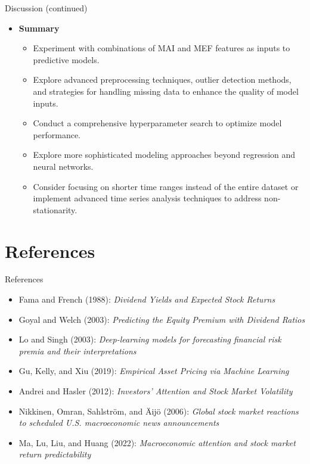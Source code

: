 \documentclass{beamer}
\begin{document}
\begin{frame}{Discussion (continued)}
  \begin{itemize}
    \item \textbf{Summary} 
    \begin{itemize}
        \item Experiment with combinations of MAI and MEF features as inputs to predictive models.
        \item Explore advanced preprocessing techniques, outlier detection methods, and strategies for handling missing data to enhance the quality of model inputs.
        \item Conduct a comprehensive hyperparameter search to optimize model performance.
        \item Explore more sophisticated modeling approaches beyond regression and neural networks.
        \item Consider focusing on shorter time ranges instead of the entire dataset or implement advanced time series analysis techniques to address non-stationarity.
    \end{itemize}
  \end{itemize}
\end{frame}

\section{References}
\begin{frame}{References}
  \begin{itemize}
    \item Fama and French (1988): \emph{Dividend Yields and Expected Stock Returns}
    \item Goyal and Welch (2003): \emph{Predicting the Equity Premium with Dividend Ratios}
    \item Lo and Singh (2003): \emph{Deep-learning models for forecasting financial risk premia and their interpretations}
    \item Gu, Kelly, and Xiu (2019): \emph{Empirical Asset Pricing via Machine Learning}
    \item Andrei and Hasler (2012): \emph{Investors’ Attention and Stock Market Volatility}
    \item Nikkinen, Omran, Sahlström, and Äijö (2006): \emph{Global stock market reactions to scheduled U.S. macroeconomic news announcements}
    \item Ma, Lu, Liu, and Huang (2022): \emph{Macroeconomic attention and stock market return predictability}
  \end{itemize}
\end{frame}
\end{document}
